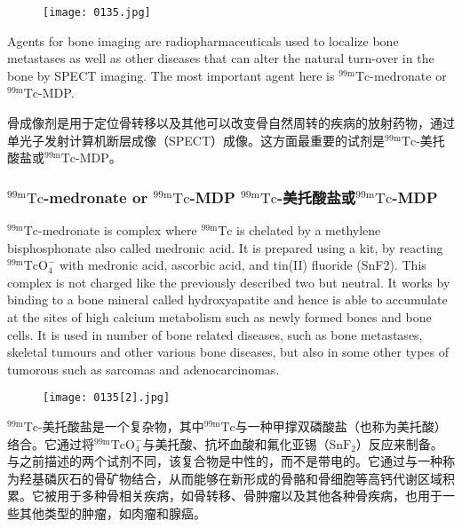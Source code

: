 \documentclass[dvipsnames, svgnames,a4paper,11pt]{article}
\begin{document}
\begin{figure}[h]
	\centering
    \texttt{[image: 0135.jpg]}    
     \label{fig137}
\end{figure}

 Agents for bone imaging are radiopharmaceuticals used to localize bone metastases
 as well as other diseases that can alter the natural turn-over in the bone by SPECT
 imaging. The most important agent here is ${}^\mathrm{99m}\mathrm{Tc}$-medronate or ${}^\mathrm{99m}\mathrm{Tc}$-MDP.

骨成像剂是用于定位骨转移以及其他可以改变骨自然周转的疾病的放射药物，通过单光子发射计算机断层成像（SPECT）成像。这方面最重要的试剂是${}^\mathrm{99m}\mathrm{Tc}$-美托酸盐或${}^\mathrm{99m}\mathrm{Tc}$-MDP。

\subsubsection{${}^\mathrm{99m}\mathrm{Tc}$-medronate or ${}^\mathrm{99m}\mathrm{Tc}$-MDP ${}^\mathrm{99m}\mathrm{Tc}$-美托酸盐或${}^\mathrm{99m}\mathrm{Tc}$-MDP }



$\mathrm{{}^{99m}Tc}$-medronate is complex where $\mathrm{{}^{99m}Tc}$ is chelated by a methylene
bisphosphonate also called medronic acid. It is prepared using a kit, by reacting
${}^\mathrm{99m}\mathrm{TcO_4^-}$ with medronic acid, ascorbic acid, and tin(II) fluoride (SnF2). This complex
is not charged like the previously described two but neutral. It works by binding to a
bone mineral called hydroxyapatite and hence is able to accumulate at the sites of
high calcium metabolism such as newly formed bones and bone cells. It is used in
number of bone related diseases, such as bone metastases, skeletal tumours and
other various bone diseases, but also in some other types of tumorous such as
sarcomas and adenocarcinomas.

\begin{figure}[h]
	\centering
    \texttt{[image: 0135[2].jpg]}    
     \label{fig138}
\end{figure}

 ${}^\mathrm{99m}\mathrm{Tc}$-美托酸盐是一个复杂物，其中${}^\mathrm{99m}\mathrm{Tc}$与一种甲撑双磷酸盐（也称为美托酸）络合。它通过将${}^\mathrm{99m}\mathrm{TcO_4^-}$与美托酸、抗坏血酸和氟化亚锡（Sn$\mathrm{F}_2$）反应来制备。与之前描述的两个试剂不同，该复合物是中性的，而不是带电的。它通过与一种称为羟基磷灰石的骨矿物结合，从而能够在新形成的骨骼和骨细胞等高钙代谢区域积累。它被用于多种骨相关疾病，如骨转移、骨肿瘤以及其他各种骨疾病，也用于一些其他类型的肿瘤，如肉瘤和腺癌。
\end{document}
